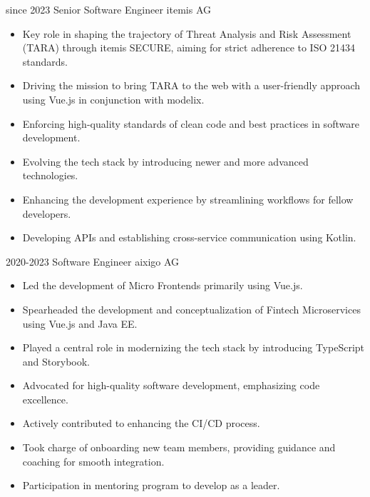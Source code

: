 \documentclass[letterpaper]{twentyonesecondcv} %
\begin{document}
{    \begin{twenty}
      \twentyitem
        {since 2023}
        {Senior Software Engineer}
        {\newline itemis AG}
        {
        \vspace{-3mm}
        \begin{itemize}[leftmargin=5mm,noitemsep,topsep=0pt]
          \item Key role in shaping the trajectory of Threat Analysis and Risk Assessment (TARA) through itemis SECURE, aiming for strict adherence to ISO 21434 standards.
          \item Driving the mission to bring TARA to the web with a user-friendly approach using Vue.js in conjunction with modelix.
          \item Enforcing high-quality standards of clean code and best practices in software development.
          \item Evolving the tech stack by introducing newer and more advanced technologies.
          \item Enhancing the development experience by streamlining workflows for fellow developers.
          \item Developing APIs and establishing cross-service communication using Kotlin.
        \end{itemize}
        }
      \twentyitem
        {2020-2023}
        {Software Engineer}
        {\newline aixigo AG}
        {
        \vspace{-3mm}
        \begin{itemize}[leftmargin=5mm,noitemsep,topsep=0pt]
          \item Led the development of Micro Frontends primarily using Vue.js.
          \item Spearheaded the development and conceptualization of Fintech Microservices using Vue.js and Java EE.
          \item Played a central role in modernizing the tech stack by introducing TypeScript and Storybook.
          \item Advocated for high-quality software development, emphasizing code excellence.
          \item Actively contributed to enhancing the CI/CD process.
          \item Took charge of onboarding new team members, providing guidance and coaching for smooth integration.
          \item Participation in mentoring program to develop as a leader.

\end{itemize}}
\end{twenty}}
\end{document}
